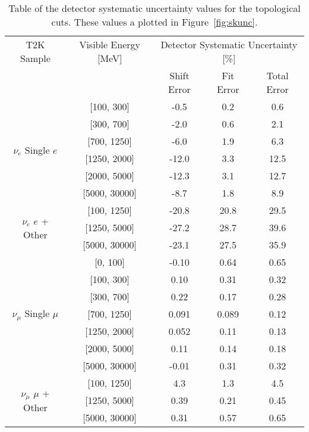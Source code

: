 \begin{table}[h]
  \centering
  \begin{tabular}{|c | c | c | c | c|}
    \hline\hline
    T2K Sample & Visible Energy [MeV] & \multicolumn{3}{|c|}{Detector Systematic Uncertainty [\%]} \\
    \cline{3-5}
    & & Shift Error & Fit Error & Total Error \\
    \hline
      \multirow{6}{*}{$\nu_{e}$ Single $e$}
       & [100, 300] &    -0.5  & 0.2 & 0.6   \\ 
       & [300, 700] &    -2.0  & 0.6 & 2.1   \\ 
       & [700, 1250] &   -6.0  & 1.9 & 6.3   \\ 
       & [1250, 2000] &  -12.0 & 3.3 & 12.5  \\ 
       & [2000, 5000] &  -12.3 & 3.1 & 12.7  \\ 
       & [5000, 30000] & -8.7  & 1.8 & 8.9   \\ 
      \hline
      \multirow{3}{*}{$\nu_{e}$ $e$ + Other}
       & [100, 1250] & -20.8  & 20.8 &  29.5    \\ 
       & [1250, 5000] & -27.2  & 28.7 &  39.6   \\ 
       & [5000, 30000] & -23.1  & 27.5 &  35.9  \\ 
      \hline
      \multirow{7}{*}{$\nu_{\mu}$ Single $\mu$}
       & [0, 100] &     -0.10    & 0.64  & 0.65   \\ 
       & [100, 300] &    0.10    & 0.31  &  0.32  \\ 
       & [300, 700] &    0.22    & 0.17  &  0.28  \\ 
       & [700, 1250] &   0.091   & 0.089 & 0.12   \\ 
       & [1250, 2000] &  0.052   & 0.11  & 0.13   \\ 
       & [2000, 5000] &  0.11    & 0.14  & 0.18   \\ 
       & [5000, 30000] & -0.01   & 0.31  & 0.32   \\ 
      \hline
      \multirow{3}{*}{$\nu_{\mu}$ $\mu$ + Other}
       & [100, 1250] &   4.3    & 1.3 &  4.5  \\ 
       & [1250, 5000] &   0.39   & 0.21 & 0.45 \\ 
       & [5000, 30000] &   0.31  & 0.57 & 0.65  \\ 
      \hline
  \end{tabular}
  \caption{Table of the detector systematic uncertainty values for the
  topological cuts. These values a plotted in Figure~\ref{fig:skunc}.}
  \label{tab:skerr}
\end{table}


